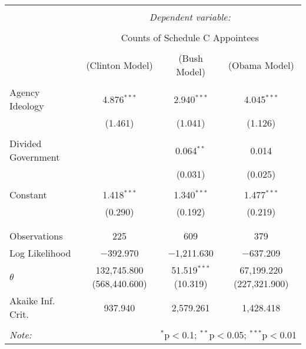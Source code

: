 \documentclass{article}
\begin{document}


\begin{table}[!htbp] \centering 
  \caption{} 
  \label{} 
\begin{tabular}{@{\extracolsep{5pt}}lccc} 
\\[-1.8ex]\hline 
\hline \\[-1.8ex] 
 & \multicolumn{3}{c}{\textit{Dependent variable:}} \\ 
\cline{2-4} 
\\[-1.8ex] & \multicolumn{3}{c}{Counts of Schedule C Appointees} \\ 
\\[-1.8ex] & (Clinton Model) & (Bush Model) & (Obama Model)\\ 
\hline \\[-1.8ex] 
 Agency Ideology & 4.876$^{***}$ & 2.940$^{***}$ & 4.045$^{***}$ \\ 
  & (1.461) & (1.041) & (1.126) \\ 
  & & & \\ 
 Divided Government &  & 0.064$^{**}$ & 0.014 \\ 
  &  & (0.031) & (0.025) \\ 
  & & & \\ 
 Constant & 1.418$^{***}$ & 1.340$^{***}$ & 1.477$^{***}$ \\ 
  & (0.290) & (0.192) & (0.219) \\ 
  & & & \\ 
\hline \\[-1.8ex] 
Observations & 225 & 609 & 379 \\ 
Log Likelihood & $-$392.970 & $-$1,211.630 & $-$637.209 \\ 
$\theta$ & 132,745.800  (568,440.600) & 51.519$^{***}$  (10.319) & 67,199.220  (227,321.900) \\ 
Akaike Inf. Crit. & 937.940 & 2,579.261 & 1,428.418 \\ 
\hline 
\hline \\[-1.8ex] 
\textit{Note:}  & \multicolumn{3}{r}{$^{*}$p$<$0.1; $^{**}$p$<$0.05; $^{***}$p$<$0.01} \\ 
\end{tabular} 
\end{table} 
\end{document}
